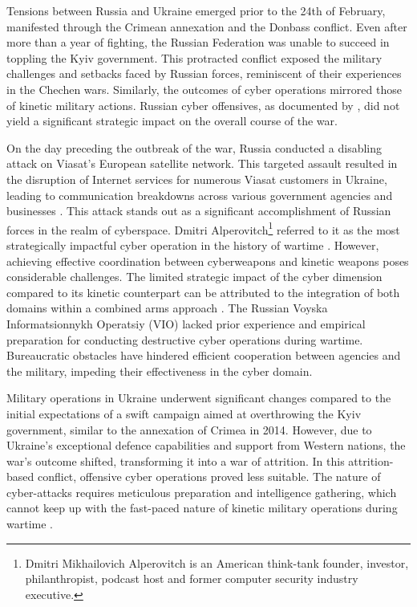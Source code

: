 Tensions between Russia and Ukraine emerged prior to the 24th of February, manifested through the Crimean annexation and the Donbass conflict. Even after more than a year of fighting, the Russian Federation was unable to succeed in toppling the Kyiv government. This protracted conflict exposed the military challenges and setbacks faced by Russian forces, reminiscent of their experiences in the Chechen wars. Similarly, the outcomes of cyber operations mirrored those of kinetic military actions. Russian cyber offensives, as documented by \textcite{baetman_2022_russias}, did not yield a significant strategic impact on the overall course of the war.

On the day preceding the outbreak of the war, Russia conducted a disabling attack on Viasat's European satellite network. This targeted assault resulted in the disruption of Internet services for numerous Viasat customers in Ukraine, leading to communication breakdowns across various government agencies and businesses \autocite{willett_2022_the}. This attack stands out as a significant accomplishment of Russian forces in the realm of cyberspace. Dmitri Alperovitch\footnote{ Dmitri Mikhailovich Alperovitch is an American think-tank founder, investor, philanthropist, podcast host and former computer security industry executive.} referred to it as the most strategically impactful cyber operation in the history of wartime \autocite{baetman_2022_russias}. However, achieving effective coordination between cyberweapons and kinetic weapons poses considerable challenges. The limited strategic impact of the cyber dimension compared to its kinetic counterpart can be attributed to the integration of both domains within a combined arms approach \autocite{wilde_2022_cyber}. The Russian Voyska Informatsionnykh Operatsiy (VIO) lacked prior experience and empirical preparation for conducting destructive cyber operations during wartime. Bureaucratic obstacles have hindered efficient cooperation between agencies and the military, impeding their effectiveness in the cyber domain.

Military operations in Ukraine underwent significant changes compared to the initial expectations of a swift campaign aimed at overthrowing the Kyiv government, similar to the annexation of Crimea in 2014. However, due to Ukraine's exceptional defence capabilities and support from Western nations, the war's outcome shifted, transforming it into a war of attrition. In this attrition-based conflict, offensive cyber operations proved less suitable. The nature of cyber-attacks requires meticulous preparation and intelligence gathering, which cannot keep up with the fast-paced nature of kinetic military operations during wartime \autocite{beecroft_2022_evaluating}.

